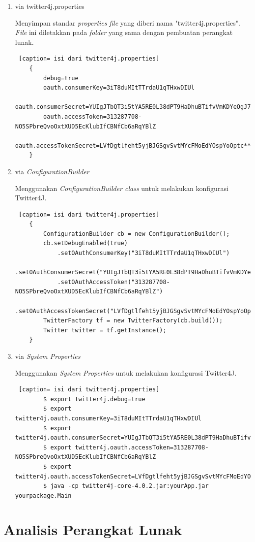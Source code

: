 \begin{enumerate}
	\item via twitter4j.properties
	
	Menyimpan standar \textit{properties} \textit{file} yang diberi nama "twitter4j.properties". \textit{File} ini diletakkan pada \textit{folder} yang sama dengan pembuatan perangkat lunak.
	\begin{lstlisting} [caption= isi dari twitter4j.properties]
	{
		debug=true
		oauth.consumerKey=3iT8duMItTTrdaU1qTHxwDIUl
		oauth.consumerSecret=YUIgJTbQT3i5tYA5RE0L38dPT9HaDhuBTifvVmKDYeOgJ7****
		oauth.accessToken=313287708-NO5SPbreQvoOxtXUD5EcKlubIfCBNfCb6aRqYBlZ
		oauth.accessTokenSecret=LVfDgtlfeht5yjBJGSgvSvtMYcFMoEdYOspYoOptc****
	}
	\end{lstlisting}
	\item via \textit{ConfigurationBuilder}
	
	Menggunakan \textit{ConfigurationBuilder class} untuk melakukan konfigurasi Twitter4J.
	\begin{lstlisting} [caption= isi dari twitter4j.properties]
	{
		ConfigurationBuilder cb = new ConfigurationBuilder();
		cb.setDebugEnabled(true)
			.setOAuthConsumerKey("3iT8duMItTTrdaU1qTHxwDIUl")
			.setOAuthConsumerSecret("YUIgJTbQT3i5tYA5RE0L38dPT9HaDhuBTifvVmKDYeOgJ7****")
			.setOAuthAccessToken("313287708-NO5SPbreQvoOxtXUD5EcKlubIfCBNfCb6aRqYBlZ")
			.setOAuthAccessTokenSecret("LVfDgtlfeht5yjBJGSgvSvtMYcFMoEdYOspYoOptc****");
		TwitterFactory tf = new TwitterFactory(cb.build());
		Twitter twitter = tf.getInstance();
	}
	\end{lstlisting}
	\item via \textit{System Properties}
	
	Menggunakan \textit{System Properties} untuk melakukan konfigurasi Twitter4J.
	\begin{lstlisting} [caption= isi dari twitter4j.properties]
		$ export twitter4j.debug=true
		$ export twitter4j.oauth.consumerKey=3iT8duMItTTrdaU1qTHxwDIUl
		$ export twitter4j.oauth.consumerSecret=YUIgJTbQT3i5tYA5RE0L38dPT9HaDhuBTifvVmKDYeOgJ7****
		$ export twitter4j.oauth.accessToken=313287708-NO5SPbreQvoOxtXUD5EcKlubIfCBNfCb6aRqYBlZ
		$ export twitter4j.oauth.accessTokenSecret=LVfDgtlfeht5yjBJGSgvSvtMYcFMoEdYOspYoOptc****
		$ java -cp twitter4j-core-4.0.2.jar:yourApp.jar yourpackage.Main
	\end{lstlisting}
\end{enumerate}

\section{Analisis Perangkat Lunak}


